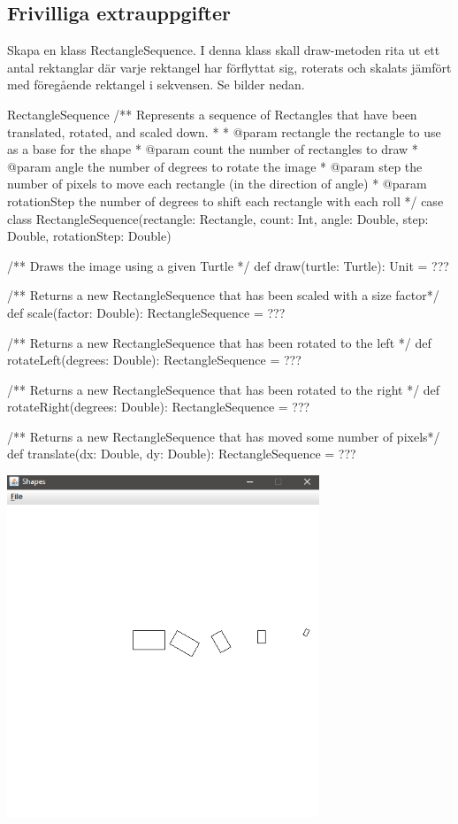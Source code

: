 \subsection{Frivilliga extrauppgifter}


\Task Skapa en klass RectangleSequence. I denna klass skall draw-metoden rita ut ett antal rektanglar där varje rektangel har förflyttat sig, roterats och skalats jämfört med föregående rektangel i sekvensen. Se bilder nedan.


\begin{ScalaSpec}{RectangleSequence}
/** Represents a sequence of Rectangles that have been translated,
    rotated, and scaled down.
  *
  * @param rectangle        the rectangle to use as a base for the shape
  * @param count            the number of rectangles to draw
  * @param angle            the number of degrees to rotate the image
  * @param step             the number of pixels to move each rectangle
                            (in the direction of angle)
  * @param rotationStep     the number of degrees to shift each rectangle
                            with each roll
  */
case class RectangleSequence(rectangle: Rectangle,
                             count: Int,
                             angle: Double,
                             step: Double,
                             rotationStep: Double) {

  /** Draws the image using a given Turtle */
  def draw(turtle: Turtle): Unit = ???

  /** Returns a new RectangleSequence that has been scaled with a size factor*/
  def scale(factor: Double): RectangleSequence = ???

  /** Returns a new RectangleSequence that has been rotated to the left */
  def rotateLeft(degrees: Double): RectangleSequence = ???

  /** Returns a new RectangleSequence that has been rotated to the right */
  def rotateRight(degrees: Double): RectangleSequence = ???

  /** Returns a new RectangleSequence that has moved some number of pixels*/
  def translate(dx: Double, dy: Double): RectangleSequence = ???
}
\end{ScalaSpec}

\includegraphics[width=0.7\textwidth]{../img/w06-lab/RollingRectangle.png}

